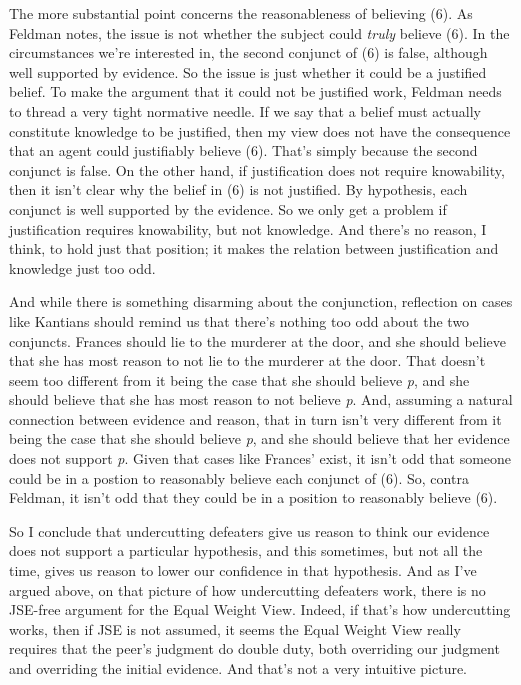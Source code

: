\documentclass[
  11pt,
  letterpaper,
  DIV=11,
  numbers=noendperiod,
  twoside]{scrartcl}
\begin{document}
The more substantial point concerns the reasonableness of believing (6).
As Feldman notes, the issue is not whether the subject could
\emph{truly} believe (6). In the circumstances we're interested in, the
second conjunct of (6) is false, although well supported by evidence. So
the issue is just whether it could be a justified belief. To make the
argument that it could not be justified work, Feldman needs to thread a
very tight normative needle. If we say that a belief must actually
constitute knowledge to be justified, then my view does not have the
consequence that an agent could justifiably believe (6). That's simply
because the second conjunct is false. On the other hand, if
justification does not require knowability, then it isn't clear why the
belief in (6) is not justified. By hypothesis, each conjunct is well
supported by the evidence. So we only get a problem if justification
requires knowability, but not knowledge. And there's no reason, I think,
to hold just that position; it makes the relation between justification
and knowledge just too odd.

And while there is something disarming about the conjunction, reflection
on cases like Kantians should remind us that there's nothing too odd
about the two conjuncts. Frances should lie to the murderer at the door,
and she should believe that she has most reason to not lie to the
murderer at the door. That doesn't seem too different from it being the
case that she should believe \emph{p}, and she should believe that she
has most reason to not believe \emph{p}. And, assuming a natural
connection between evidence and reason, that in turn isn't very
different from it being the case that she should believe \emph{p}, and
she should believe that her evidence does not support \emph{p}. Given
that cases like Frances' exist, it isn't odd that someone could be in a
postion to reasonably believe each conjunct of (6). So, contra Feldman,
it isn't odd that they could be in a position to reasonably believe (6).

So I conclude that undercutting defeaters give us reason to think our
evidence does not support a particular hypothesis, and this sometimes,
but not all the time, gives us reason to lower our confidence in that
hypothesis. And as I've argued above, on that picture of how
undercutting defeaters work, there is no JSE-free argument for the Equal
Weight View. Indeed, if that's how undercutting works, then if JSE is
not assumed, it seems the Equal Weight View really requires that the
peer's judgment do double duty, both overriding our judgment and
overriding the initial evidence. And that's not a very intuitive
picture.
\end{document}
